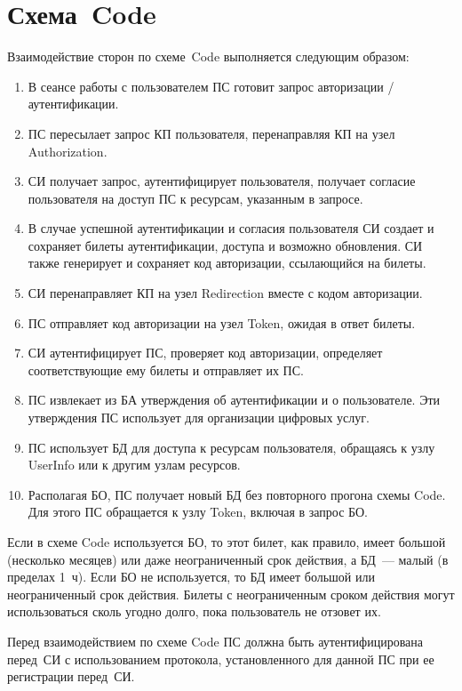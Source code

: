 \section{Схема~Code}\label{OIDC.Code}

Взаимодействие сторон по схеме~Code выполняется следующим образом:

\begin{enumerate}
\item 
В сеансе работы с пользователем ПС готовит запрос авторизации / аутентификации.

\item 
ПС пересылает запрос КП пользователя, перенаправляя КП на узел Authorization.

\item 
СИ получает запрос, аутентифицирует пользователя, получает согласие пользователя
на доступ ПС к ресурсам, указанным в запросе.

\item 
В случае успешной аутентификации и согласия пользователя СИ создает и сохраняет
билеты аутентификации, доступа и возможно обновления. СИ также генерирует и
сохраняет код авторизации, ссылающийся на билеты.

\item 
СИ перенаправляет КП на узел Redirection вместе с кодом авторизации.
 
\item 
ПС отправляет код авторизации на узел Token, ожидая в ответ билеты. 

\item 
СИ аутентифицирует ПС, проверяет код авторизации, определяет соответствующие ему
билеты и отправляет их ПС.

\item 
ПС извлекает из БА утверждения об аутентификации и о пользователе. Эти
утверждения ПС использует для организации цифровых услуг.

\item 
ПС использует БД для доступа к ресурсам пользователя,
обращаясь к узлу UserInfo или к другим узлам ресурсов. 

\item 
Располагая БО, ПС получает новый БД без повторного прогона схемы 
Code. Для этого ПС обращается к узлу Token, включая в запрос БО.
\end{enumerate}

Если в схеме Code используется БО, то этот билет, как правило, 
имеет большой (несколько месяцев) или даже неограниченный срок действия,
а БД~--- малый (в пределах 1~ч). 
%
Если БО не используется, то БД имеет большой или неограниченный срок 
действия. 
%
Билеты с неограниченным сроком действия могут использоваться сколь 
угодно долго, пока пользователь не отзовет их.

Перед взаимодействием по схеме Code ПС должна быть аутентифицирована перед~СИ с 
использованием протокола, установленного для данной ПС при ее регистрации 
перед~СИ.
